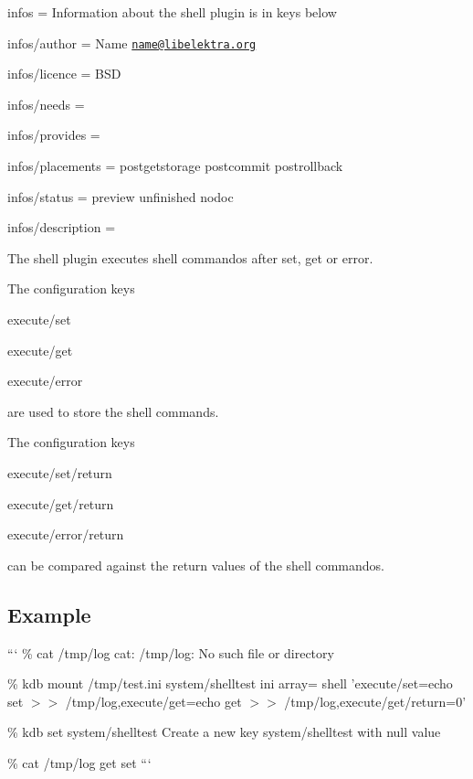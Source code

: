 
\begin{DoxyItemize}
\item infos = Information about the shell plugin is in keys below
\item infos/author = Name \href{mailto:name@libelektra.org}{\tt name@libelektra.\+org}
\item infos/licence = B\+S\+D
\item infos/needs =
\item infos/provides =
\item infos/placements = postgetstorage postcommit postrollback
\item infos/status = preview unfinished nodoc
\item infos/description =
\end{DoxyItemize}

The shell plugin executes shell commandos after set, get or error.

The configuration keys


\begin{DoxyItemize}
\item {\ttfamily execute/set}
\item {\ttfamily execute/get}
\item {\ttfamily execute/error}
\end{DoxyItemize}

are used to store the shell commands.

The configuration keys


\begin{DoxyItemize}
\item {\ttfamily execute/set/return}
\item {\ttfamily execute/get/return}
\item {\ttfamily execute/error/return}
\end{DoxyItemize}

can be compared against the return values of the shell commandos.

\subsection*{Example}

``` \% cat /tmp/log cat\+: /tmp/log\+: No such file or directory

\% kdb mount /tmp/test.ini system/shelltest ini array= shell 'execute/set=echo set $>$$>$ /tmp/log,execute/get=echo get $>$$>$ /tmp/log,execute/get/return=0'

\% kdb set system/shelltest Create a new key system/shelltest with null value

\% cat /tmp/log get set ``` 